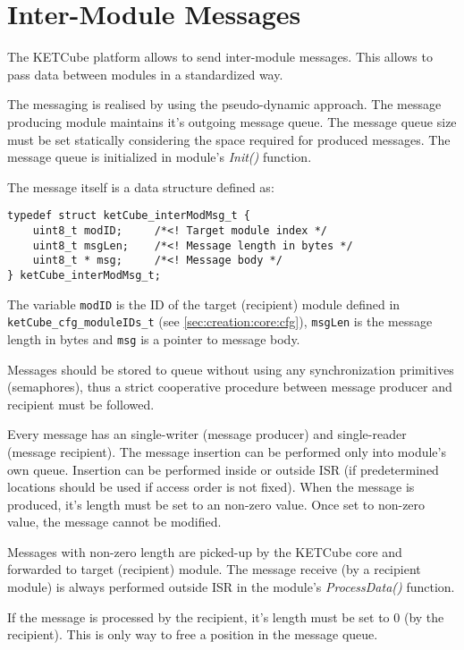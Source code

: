 \documentclass[twoside,a4paper]{refart}
\begin{document}
\clearpage
\section{Inter-Module Messages}\label{sec:msg}
The KETCube platform allows to send inter-module messages. This allows to pass data between modules in a standardized way.

The messaging is realised by using the pseudo-dynamic approach. The message producing module  maintains it's outgoing message queue. The message queue size must be set statically considering the space required for produced messages. The message queue is initialized in module's {\it Init()} function.

The message itself is a data structure defined as:
\begin{verbatim}
typedef struct ketCube_interModMsg_t {
    uint8_t modID;     /*<! Target module index */
    uint8_t msgLen;    /*<! Message length in bytes */
    uint8_t * msg;     /*<! Message body */
} ketCube_interModMsg_t;
\end{verbatim}

The variable {\tt modID} is the ID of the target (recipient) module defined in {\tt ketCube\_cfg\_moduleIDs\_t} (see \ref{sec:creation:core:cfg}), {\tt msgLen} is the message length in bytes and {\tt *msg} is a pointer to message body.

Messages should be stored to queue without using any synchronization primitives (semaphores), thus a strict cooperative procedure between message producer and recipient must be followed. 

Every message has an single-writer (message producer) and single-reader (message recipient). The message insertion can be performed only into module's own queue. Insertion can be performed inside or outside ISR (if predetermined locations should be used if access order is not fixed). When the message is produced, it's length must be set to an non-zero value. Once set to non-zero value, the message cannot be modified.

Messages with non-zero length are picked-up by the KETCube core and forwarded to target (recipient) module. The message receive (by a recipient module) is always performed outside ISR in the module's {\it ProcessData()} function.

If the message is processed by the recipient, it's length must be set to 0 (by the recipient). This is only way to free a position in the message queue.



\clearpage





\end{document}
